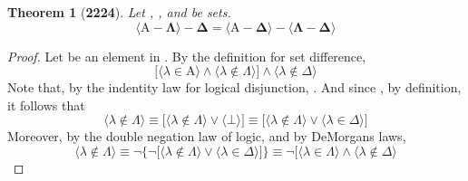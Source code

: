 \documentclass[preview]{standalone}
\newtheorem{theorem}{Theorem}
\begin{document}
\begin{theorem}[\textbf{2224}]
    Let , \bm{$\Lambda$}, and \bm{$\Delta$} be sets. 
    \begin{equation*}
        \bm{
            \Big \langle \mathrm{A} - \Lambda \Big \rangle - \Delta 
                = 
            \Big \langle \mathrm{A} - \Delta \Big \rangle 
                - 
            \Big \langle \Lambda - \Delta \Big \rangle
        }
    \end{equation*}
\end{theorem}
\begin{proof}
    Let \bm{$\lambda$} be an element in 
    . 
    By the definition for set difference,
    \begin{equation*}
        \bigg[
            \Big \langle \lambda \in \mathrm{A} \Big \rangle
                \land
            \Big \langle \lambda \notin \Lambda \Big \rangle
        \bigg]
            \land
        \Big \langle \lambda \notin \Delta \Big \rangle
    \end{equation*}
    Note that, by the indentity law for logical disjunction, 
    \bm{$
    \lambda \notin \Lambda
        \equiv 
    \lambda \notin \Lambda
        \lor 
    \bot
    $}.
    And since
    \bm{$
    \lambda \in \Delta
        \equiv 
    \bot
    $},
    by definition,
    it follows that
    \begin{equation*}
        \Big \langle \lambda \notin \Lambda \Big \rangle
            \equiv
        \bigg[
            \Big \langle \lambda \notin \Lambda \Big \rangle
                \lor
            \Big \langle \bot \Big \rangle
        \bigg]
            \equiv
        \bigg[
            \Big \langle \lambda \notin \Lambda \Big \rangle
                \lor
            \Big \langle \lambda \in \Delta \Big \rangle
        \bigg]
    \end{equation*}
    Moreover, by the double negation law of logic, and by DeMorgans laws,
    \begin{equation*}
        \Big \langle \lambda \notin \Lambda \Big \rangle
            \equiv
        \lnot \Bigg\{
            \lnot \bigg[
                \Big \langle \lambda \notin \Lambda \Big \rangle
                    \lor
                \Big \langle \lambda \in \Delta \Big \rangle
            \bigg]
        \Bigg\}
            \equiv
        \lnot \bigg[
            \Big \langle \lambda \in \Lambda \Big \rangle
                \land
            \Big \langle \lambda \notin \Delta \Big \rangle

\end{equation*}
\end{proof}
\end{document}
